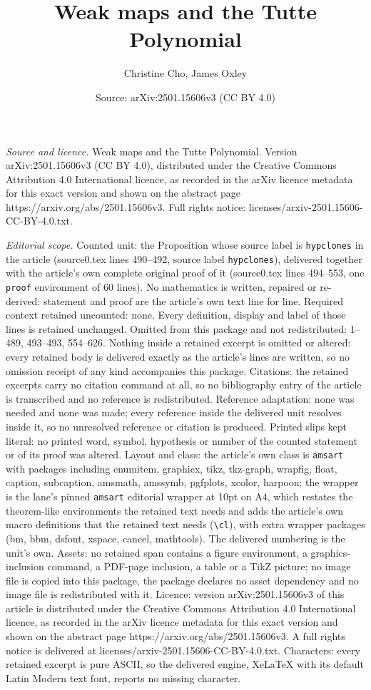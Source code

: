\documentclass[10pt,a4paper]{amsart}
\title[Weak maps and the Tutte Polynomial]{Weak maps and the Tutte Polynomial}
\author{Christine Cho, James Oxley}
\date{Source: arXiv:2501.15606v3 (CC BY 4.0)}
\begin{document}
\maketitle

\noindent\emph{Source and licence.} Weak maps and the Tutte Polynomial. Version arXiv:2501.15606v3 (CC BY 4.0), distributed under the Creative Commons Attribution 4.0 International licence, as recorded in the arXiv licence metadata for this exact version and shown on the abstract page https://arxiv.org/abs/2501.15606v3. Full rights notice: licenses/arxiv-2501.15606-CC-BY-4.0.txt.\par\smallskip

\noindent\textit{Editorial scope.} Counted unit: the Proposition whose source label is \texttt{hypclones} in the article (source0.tex lines 490--492, source label \texttt{hypclones}), delivered together with the article's own complete original proof of it (source0.tex lines 494--553, one \texttt{proof} environment of 60 lines). No mathematics is written, repaired or re-derived: statement and proof are the article's own text line for line. Required context retained uncounted: none. Every definition, display and label of those lines is retained unchanged. Omitted from this package and not redistributed: 1--489, 493--493, 554--626. Nothing inside a retained excerpt is omitted or altered: every retained body is delivered exactly as the article's lines are written, so no omission receipt of any kind accompanies this package. Citations: the retained excerpts carry no citation command at all, so no bibliography entry of the article is transcribed and no reference is redistributed. Reference adaptation: none was needed and none was made; every reference inside the delivered unit resolves inside it, so no unresolved reference or citation is produced. Printed slips kept literal: no printed word, symbol, hypothesis or number of the counted statement or of its proof was altered. Layout and class: the article's own class is \texttt{amsart} with packages including enumitem, graphicx, tikz, tkz-graph, wrapfig, float, caption, subcaption, amsmath, amssymb, pgfplots, xcolor, harpoon; the wrapper is the lane's pinned \texttt{amsart} editorial wrapper at 10pt on A4, which restates the theorem-like environments the retained text needs and adds the article's own macro definitions that the retained text needs (\texttt{\textbackslash cl}), with extra wrapper packages (bm, bbm, dsfont, xspace, cancel, mathtools). The delivered numbering is the unit's own. Assets: no retained span contains a figure environment, a graphics-inclusion command, a PDF-page inclusion, a table or a TikZ picture; no image file is copied into this package, the package declares no asset dependency and no image file is redistributed with it. Licence: version arXiv:2501.15606v3 of this article is distributed under the Creative Commons Attribution 4.0 International licence, as recorded in the arXiv licence metadata for this exact version and shown on the abstract page https://arxiv.org/abs/2501.15606v3. A full rights notice is delivered at licenses/arxiv-2501.15606-CC-BY-4.0.txt. Characters: every retained excerpt is pure ASCII, so the delivered engine, XeLaTeX with its default Latin Modern text font, reports no missing character.
\end{document}
